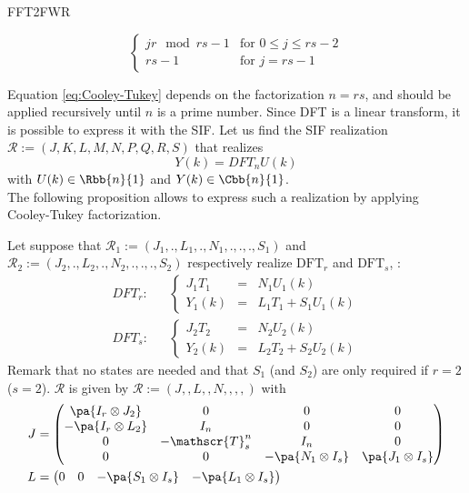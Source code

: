 \begin{command}{FFT2FWR}
\begin{itemize}
\begin{equation}
\begin{cases}
jr \mod rs-1 &\text{for\ } 0 \leq j \leq rs - 2 \\
rs-1 & \text{for\ } j=rs-1
\end{cases}
\end{equation}
\end{itemize}
Equation \eqref{eq:Cooley-Tukey} depends on the factorization $n=rs$, and should be applied recursively until $n$ is a prime number.
Since DFT is a linear transform, it is possible to express it with the SIF. Let us find the SIF realization $\mathcal{R}:=(J,K,L,M,N,P,Q,R,S)$ that realizes
\begin{equation}
Y(k)=DFT_n U(k)
\end{equation}
with $U(k)\in\Rbb{n}{1}$ and $Y(k)\in\Cbb{n}{1}$.\\
The following proposition allows to express such a realization by applying Cooley-Tukey factorization.
\begin{proposition}\label{prop:Cooley-Tukey}
Let suppose that $\mathcal{R}_1:=(J_1,.,L_1,.,N_1,.,.,.,S_1)$ and $\mathcal{R}_2:=(J_2,.,L_2,.,N_2,.,.,.,S_2)$ respectively realize $\text{DFT}_r$ and $\text{DFT}_s$, :
\begin{eqnarray}\label{eq:SIF-DFT_r}
DFT_r: &&\left\{ \begin{array}{rcl}
J_1 T_1 &=& N_1 U_1(k) \\
Y_1(k) &=& L_1 T_1 + S_1U_1(k)
\end{array}\right.\\ \label{eq:SIF-DFT_s}
DFT_s: &&\left\{ \begin{array}{rcl}
J_2 T_2 &=& N_2 U_2(k) \\
Y_2(k) &=& L_2 T_2 + S_2U_2(k)
\end{array}\right.
\end{eqnarray}
Remark that no states are needed and that $S_1$ (and $S_2$) are only required if $r=2$ ($s=2$).
$\mathcal{R}$ is given by $\mathcal{R}:=(J,,L,,N,,,,)$ with
\begin{align}\label{eq:Cooley-Tukey-SIF1}
J&=\begin{pmatrix}
\pa{I_r \otimes J_2} & 0 & 0 & 0 \\
-\pa{I_r \otimes L_2} & I_n & 0 & 0 \\
0 & -\mathscr{T}_s^n & I_n & 0 \\
0 & 0 & -\pa{N_1 \otimes I_s} & \pa{J_1 \otimes I_s} \\
\end{pmatrix}\\
L&=\begin{pmatrix}
0 & 0 & -\pa{S_1 \otimes I_s} & -\pa{L_1 \otimes I_s}\\

\end{pmatrix}
\end{align}
\end{proposition}
\end{command}

